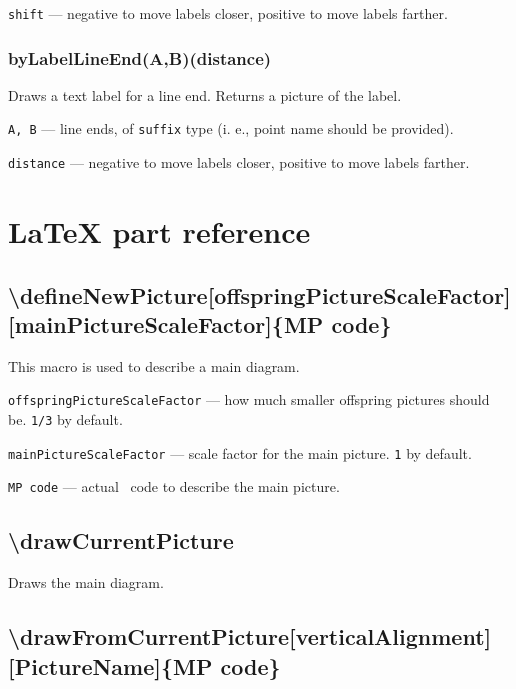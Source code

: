 \documentclass{ltxdoc}
\begin{document}
\texttt{shift} — negative to move labels closer, positive to move labels farther.

\subsubsection{byLabelLineEnd(A,B)(distance)}

Draws a text label for a line end. Returns a picture of the label.

\texttt{A, B} — line ends, of \texttt{suffix} type (i. e., point name should be provided).

\texttt{distance} — negative to move labels closer, positive to move labels farther.


\section{LaTeX part reference}

\subsection{\textbackslash defineNewPicture[offspringPictureScaleFactor][mainPictureScaleFactor]\{MP code\}}

	This macro is used to describe a main diagram.

	\texttt{offspringPictureScaleFactor} — how much smaller offspring pictures should be. \texttt{1/3} by default.
	
	\texttt{mainPictureScaleFactor} — scale factor for the main picture. \texttt{1} by default.
	
	\texttt{MP code} — actual \METAPOST\ code to describe the main picture.

\subsection{\textbackslash drawCurrentPicture}
	
	Draws the main diagram.





\subsection{\textbackslash drawFromCurrentPicture[verticalAlignment][PictureName]\{MP code\}}
\end{document}
